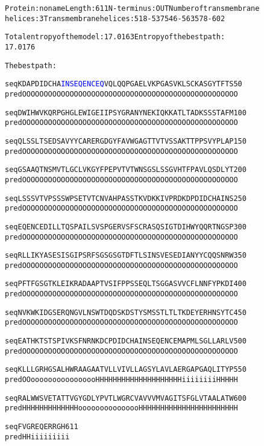 \documentclass{article}
\begin{document}
\begin{alltt}
Protein: noname Length:  611 N-terminus: OUT  Number of transmembrane
helices: 3 Transmembrane helices: 518-537 546-563 578-602 

Total entropy of the model:  17.0163 Entropy of the best path: 
17.0176

The best path:

     seq  KDAPDIDCHA \textcolor{blue}{INSEQENCEQ} VQLQQPGAEL VKPGASVKLS CKASGYTFTS    50
     pred OOOOOOOOOO OOOOOOOOOO OOOOOOOOOO OOOOOOOOOO OOOOOOOOOO 

     seq  DWIHWVKQRP GHGLEWIGEI IPSYGRANYN EKIQKKATLT ADKSSSTAFM   100
     pred OOOOOOOOOO OOOOOOOOOO OOOOOOOOOO OOOOOOOOOO OOOOOOOOOO 

     seq  QLSSLTSEDS AVYYCARERG DGYFAVWGAG TTVTVSSAKT TPPSVYPLAP   150
     pred OOOOOOOOOO OOOOOOOOOO OOOOOOOOOO OOOOOOOOOO OOOOOOOOOO 

     seq  GSAAQTNSMV TLGCLVKGYF PEPVTVTWNS GSLSSGVHTF PAVLQSDLYT   200
     pred OOOOOOOOOO OOOOOOOOOO OOOOOOOOOO OOOOOOOOOO OOOOOOOOOO 

     seq  LSSSVTVPSS SWPSETVTCN VAHPASSTKV DKKIVPRDKD PDIDCHAINS   250
     pred OOOOOOOOOO OOOOOOOOOO OOOOOOOOOO OOOOOOOOOO OOOOOOOOOO 

     seq  EQENCEDILL TQSPAILSVS PGERVSFSCR ASQSIGTDIH WYQQRTNGSP   300
     pred OOOOOOOOOO OOOOOOOOOO OOOOOOOOOO OOOOOOOOOO OOOOOOOOOO 

     seq  RLLIKYASES ISGIPSRFSG SGSGTDFTLS INSVESEDIA NYYCQQSNRW   350
     pred OOOOOOOOOO OOOOOOOOOO OOOOOOOOOO OOOOOOOOOO OOOOOOOOOO 

     seq  PFTFGSGTKL EIKRADAAPT VSIFPPSSEQ LTSGGASVVC FLNNFYPKDI   400
     pred OOOOOOOOOO OOOOOOOOOO OOOOOOOOOO OOOOOOOOOO OOOOOOOOOO 

     seq  NVKWKIDGSE RQNGVLNSWT DQDSKDSTYS MSSTLTLTKD EYERHNSYTC   450
     pred OOOOOOOOOO OOOOOOOOOO OOOOOOOOOO OOOOOOOOOO OOOOOOOOOO 

     seq  EATHKTSTSP IVKSFNRNKD CPDIDCHAIN SEQENCEMAP MLSGLLARLV   500
     pred OOOOOOOOOO OOOOOOOOOO OOOOOOOOOO OOOOOOOOOO OOOOOOOOOO 

     seq  KLLLGRHGSA LHWRAAGAAT VLLVIVLLAG SYLAVLAERG APGAQLITYP   550
     pred OOoooooooo oooooooHHH HHHHHHHHHH HHHHHHHiii iiiiiHHHHH 

     seq  RALWWSVETA TTVGYGDLYP VTLWGRCVAV VVMVAGITSF GLVTAALATW   600
     pred HHHHHHHHHH HHHooooooo oooooooHHH HHHHHHHHHH HHHHHHHHHH 

     seq  FVGREQERRG H  611
     pred HHiiiiiiii i
\end{alltt}
\end{document}
